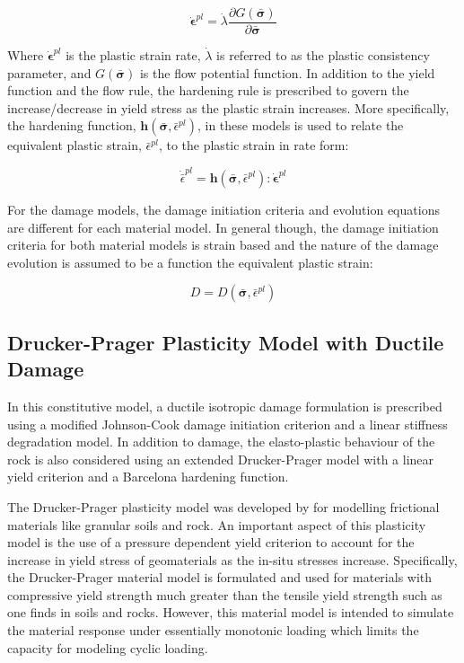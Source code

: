 \begin{equation}
\dot{\boldsymbol{\epsilon}}^{pl}=\dot{\lambda} \frac{\partial G\left(\bar{\boldsymbol{\sigma}}\right)}{\partial \bar{\boldsymbol{\sigma}}}
\label{eqn:gen6}
\end{equation}

Where $\dot{\boldsymbol{\epsilon}}^{pl}$ is the plastic strain rate, $\dot{\lambda}$ is referred to as the plastic consistency parameter, and $G\left(\bar{\boldsymbol{\sigma}}\right)$ is the flow potential function. In addition to the yield function and the flow rule, the hardening rule is prescribed to govern the increase/decrease in yield stress as the plastic strain increases. More specifically, the hardening function, $\boldsymbol{h}\left(\bar{\boldsymbol{\sigma}}, \bar{\epsilon}^{pl}\right)$, in these models is used to relate the equivalent plastic strain, $\bar{\epsilon}^{pl}$,  to the plastic strain in rate form: 

\begin{equation}
    \dot{\bar{\epsilon}}^{pl}  = 
    \boldsymbol{h}\left(\bar{\boldsymbol{\sigma}}, \bar{\epsilon}^{pl}\right):
    \dot{\boldsymbol{\epsilon}}^{pl}
\label{eqn:gen7}
\end{equation}

For the damage models, the damage initiation criteria and evolution equations are different for each material model. In general though, the damage initiation criteria for both material models is strain based and the nature of the damage evolution is assumed to be a function the equivalent plastic strain:

\begin{equation}
D=D\left(\bar{\boldsymbol{\sigma}},\bar{\epsilon}^{pl}\right)
\label{eqn:gen8}
\end{equation}

\subsection{Drucker-Prager Plasticity Model with Ductile Damage}

In this constitutive model, a ductile isotropic damage formulation is prescribed using a modified Johnson-Cook damage initiation criterion and a linear stiffness degradation model. In addition to damage, the elasto-plastic behaviour of the rock is also considered using an extended Drucker-Prager model with a linear yield criterion and a Barcelona hardening function. 

The Drucker-Prager plasticity model was developed by \citet{drucker_implications_1950} for modelling frictional materials like granular soils and rock. An important aspect of this plasticity model is the use of a pressure dependent yield criterion to account for the increase in yield stress of geomaterials as the in-situ stresses increase. Specifically, the Drucker-Prager material model is formulated and used for materials with compressive yield strength much greater than the tensile yield strength such as one finds in soils and rocks. However, this material model is intended to simulate the material response under essentially monotonic loading which limits the capacity for modeling cyclic loading.


